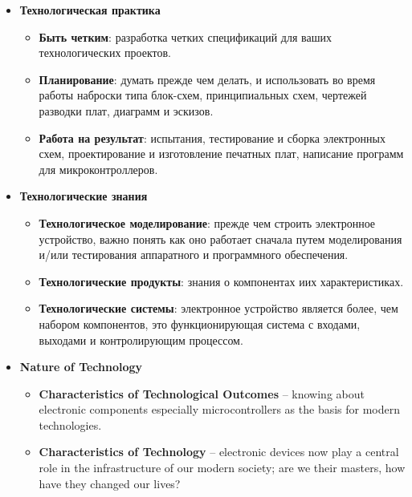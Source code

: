 \begin{itemize}

\item \textbf{Технологическая практика}

\begin{itemize}

\item\textbf{Быть четким}: разработка четких спецификаций для ваших
технологических проектов.

\item\textbf{Планирование}: думать прежде чем делать, и использовать во время
работы наброски типа блок-схем, принципиальных схем, чертежей разводки плат,
диаграмм и эскизов.

\item\textbf{Работа на результат}: испытания, тестирование и сборка электронных
схем, проектирование и изготовление печатных плат, написание программ для
микроконтроллеров.

\end{itemize}

\item \textbf{Технологические знания}

\begin{itemize}

\item\textbf{Технологическое моделирование}: прежде чем строить электронное
устройство, важно понять как оно работает сначала путем моделирования и/или
тестирования аппаратного и программного обеспечения.

\item\textbf{Технологические продукты}: знания о компонентах и ​​их
характеристиках.

\item\textbf{Технологические системы}: электронное устройство является более,
чем набором компонентов, это функционирующая система с входами, выходами и
контролирующим процессом.

\end{itemize}

\item \textbf{Nature of Technology}

\begin{itemize}

\item\textbf{Characteristics of Technological Outcomes} – knowing about
electronic components especially microcontrollers as the basis for modern technologies.

\item\textbf{Characteristics of Technology} – electronic devices now play a
central role in the infrastructure of our modern society; are we their masters, how have they changed our lives?

\end{itemize}

\end{itemize}

